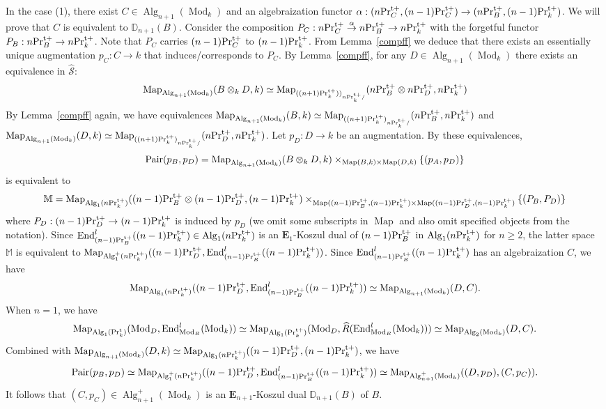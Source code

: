 \documentclass[leqno,12pt]{amsart}
\theoremstyle{plain}
\theoremstyle{definition}
\newcommand{\DD}{\mathbb{D}}
\newcommand{\PRT}{\textup{Pr}^{\textup{t}}}
\newcommand{\PRTT}{\textup{Pr}^{\textup{t}+}}
\newcommand{\Mod}{\operatorname{Mod}}
\newcommand{\wSSS}{\widehat{\mathcal{S}}}
\newcommand{\Map}{\operatorname{Map}}
\newcommand{\Alg}{\operatorname{Alg}}
\newcommand{\End}{\operatorname{End}}
\newcommand{\eone}{\mathbf{E}_1}
\begin{document}
In the case (1), there exist $C\in \Alg_{n+1}(\Mod_k)$ and an algebraization functor $\alpha:(n\PRTT_C,(n-1)\PRTT_C)\to (n\PRTT_B,(n-1)\PRTT_k)$.
We will prove that $C$ is equivalent to $\DD_{n+1}(B)$.
Consider the composition $P_C:n\PRTT_C\stackrel{\alpha}{\to} n\PRTT_B\to n\PRTT_k$ with the forgetful functor $P_B:n\PRTT_B\to n\PRTT_k$.
Note that $P_C$ carries $(n-1)\PRTT_C$ to $(n-1)\PRTT_k$.
From Lemma~\ref{compff} we deduce that there exists an essentially unique augmentation $p_C:C\to k$ that induces/corresponds to $P_C$. 
By Lemma~\ref{compff}, for any $D\in \Alg_{n+1}(\Mod_k)$ there exists an equivalence in $\wSSS$:
\begin{eqnarray*}
\Map_{\Alg_{n+1}(\Mod_k)}(B\otimes_k D,k) \simeq \Map_{((n+1)\PRTT_k))_{n\PRTT_k/}}(n\PRTT_B\otimes n\PRTT_D,n\PRTT_k)
\end{eqnarray*}
By Lemma~\ref{compff} again, we have equivalences
$\Map_{\Alg_{n+1}(\Mod_k)}(B,k)\simeq \Map_{((n+1)\PRTT_k)_{n\PRTT_k/}}(n\PRTT_B,n\PRTT_k)$ and $\Map_{\Alg_{n+1}(\Mod_k)}(D,k)\simeq \Map_{((n+1)\PRTT_k)_{n\PRTT_k/}}(n\PRTT_D,n\PRTT_k)$.
Let $p_D:D \to k$ be an augmentation. By these equivalences, 
\begin{eqnarray*}
\textup{Pair}(p_B,p_D)=\Map_{\Alg_{n+1}(\Mod_k)}(B\otimes_k D,k)\times_{\Map(B,k)\times \Map(D,k)}\{(p_A,p_D)\}
\end{eqnarray*}
is equivalent to
\[
\mathbb{M}=\Map_{\Alg_1(n\PRTT_k)}((n-1)\PRTT_B\otimes (n-1)\PRTT_D,(n-1)\PRTT_k)\times_{ \Map((n-1)\PRTT_B,(n-1)\PRTT_k)\times \Map((n-1)\PRTT_D,(n-1)\PRTT_k)}\{(P_B,P_D)\}
\]
where $P_D:(n-1)\PRTT_D\to (n-1)\PRTT_k$ is induced by $p_D$ 
(we omit some subscripts in $\Map$
and also omit specified objects from the notation).
Since  $\End_{(n-1)\PRTT_B}^l((n-1)\PRTT_k)\in \Alg_1(n\PRTT_k)$ is an $\eone$-Koszul dual of $(n-1)\PRTT_B$ in $\Alg_1(n\PRTT_k)$ for $n\ge2$,
the latter space $\mathbb{M}$
is equivalent to $\Map_{\Alg_1^+(n\PRTT_k)}((n-1)\PRTT_D, \End_{(n-1)\PRTT_B}^l((n-1)\PRTT_k))$.
Since $\End_{(n-1)\PRTT_B}^l((n-1)\PRTT_k)$ has an algebraization $C$, 
we have
\[
\Map_{\Alg_1(n\PRTT_k)}((n-1)\PRTT_D, \End_{(n-1)\PRTT_B}^l((n-1)\PRTT_k))\simeq \Map_{\Alg_{n+1}(\Mod_k)}(D,C).
\]
When $n=1$,
we have
\[
\Map_{\Alg_1(\PRT_k)}(\Mod_D, \End_{\Mod_B}^l(\Mod_k))\simeq \Map_{\Alg_1(\PRTT_k)}(\Mod_D, \widehat{R}(\End_{\Mod_B}^l(\Mod_k)))\simeq \Map_{\Alg_{2}(\Mod_k)}(D,C).
\]
Combined with  $\Map_{\Alg_{n+1}(\Mod_k)}(D,k)\simeq \Map_{\Alg_1(n\PRTT_k)}((n-1)\PRTT_D,(n-1)\PRTT_k)$,
we have
\[
\textup{Pair}(p_B,p_D)\simeq \Map_{\Alg_1^+(n\PRTT_k)}((n-1)\PRTT_D, \End_{(n-1)\PRTT_B}^l((n-1)\PRTT_k))\simeq \Map_{\Alg^+_{n+1}(\Mod_k)}((D,p_D),(C,p_C)).
\]
It follows that $(C,p_C)\in \Alg_{n+1}^+(\Mod_k)$ is an $\mathbf{E}_{n+1}$-Koszul dual $\DD_{n+1}(B)$ of $B$.
\end{document}
